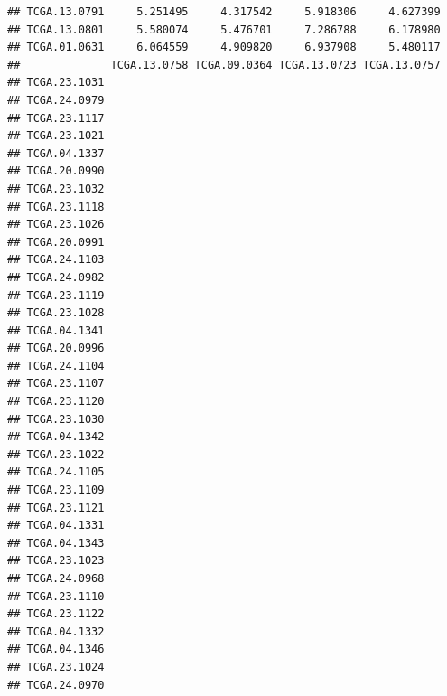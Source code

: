 \documentclass[UTF8]{beamer}\usepackage[]{graphicx}\usepackage[]{color}
\makeatletter
\newenvironment{kframe}{%
 \def\at@end@of@kframe{}%
 \ifinner\ifhmode%
  \def\at@end@of@kframe{\end{minipage}}%
  \begin{minipage}{\columnwidth}%
 \fi\fi%
 \def\FrameCommand##1{\hskip\@totalleftmargin \hskip-\fboxsep
 \colorbox{shadecolor}{##1}\hskip-\fboxsep
     \hskip-\linewidth \hskip-\@totalleftmargin \hskip\columnwidth}%
 \MakeFramed {\advance\hsize-\width
   \@totalleftmargin\z@ \linewidth\hsize
   \@setminipage}}%
 {\par\unskip\endMakeFramed%
 \at@end@of@kframe}
\newenvironment{knitrout}{}{} %
\makeatother
\begin{document}
\begin{frame}[fragile]
\begin{knitrout}
\begin{kframe}
\begin{verbatim}
## TCGA.13.0791     5.251495     4.317542     5.918306     4.627399
## TCGA.13.0801     5.580074     5.476701     7.286788     6.178980
## TCGA.01.0631     6.064559     4.909820     6.937908     5.480117
##              TCGA.13.0758 TCGA.09.0364 TCGA.13.0723 TCGA.13.0757
## TCGA.23.1031                                                    
## TCGA.24.0979                                                    
## TCGA.23.1117                                                    
## TCGA.23.1021                                                    
## TCGA.04.1337                                                    
## TCGA.20.0990                                                    
## TCGA.23.1032                                                    
## TCGA.23.1118                                                    
## TCGA.23.1026                                                    
## TCGA.20.0991                                                    
## TCGA.24.1103                                                    
## TCGA.24.0982                                                    
## TCGA.23.1119                                                    
## TCGA.23.1028                                                    
## TCGA.04.1341                                                    
## TCGA.20.0996                                                    
## TCGA.24.1104                                                    
## TCGA.23.1107                                                    
## TCGA.23.1120                                                    
## TCGA.23.1030                                                    
## TCGA.04.1342                                                    
## TCGA.23.1022                                                    
## TCGA.24.1105                                                    
## TCGA.23.1109                                                    
## TCGA.23.1121                                                    
## TCGA.04.1331                                                    
## TCGA.04.1343                                                    
## TCGA.23.1023                                                    
## TCGA.24.0968                                                    
## TCGA.23.1110                                                    
## TCGA.23.1122                                                    
## TCGA.04.1332                                                    
## TCGA.04.1346                                                    
## TCGA.23.1024                                                    
## TCGA.24.0970                                                    

\end{verbatim}
\end{kframe}
\end{knitrout}
\end{frame}
\end{document}
